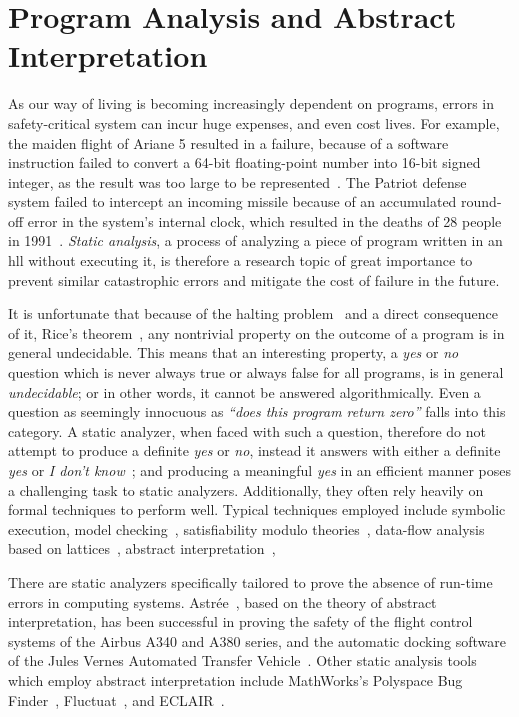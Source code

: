 \section{Program Analysis and Abstract Interpretation}
\label{bg:sec:abstract_interpretation}

As our way of living is becoming increasingly dependent on programs,
errors in safety-critical system can incur huge expenses, and even cost
lives.  For example, the maiden flight of Ariane 5 resulted in a failure,
because of a software instruction failed to convert a 64-bit floating-point
number into 16-bit signed integer, as the result was too large to be
represented~\cite{dowson97}.  The Patriot defense system failed to intercept
an incoming missile because of an accumulated round-off error in the
system's internal clock, which resulted in the deaths of 28 people in
1991~\cite{patriot}. \emph{Static analysis}, a process of analyzing a piece of
program written in an \gls{hll} without executing it, is therefore a research
topic of great importance to prevent similar catastrophic errors and mitigate
the cost of failure in the future.

It is unfortunate that because of the halting problem~\cite{turing37} and a
direct consequence of it, Rice's theorem~\cite{rice53}, any nontrivial property
on the outcome of a program is in general undecidable.  This means that an
interesting property, a \emph{yes} or \emph{no} question which is never always
true or always false for all programs, is in general \emph{undecidable};
or in other words, it cannot be answered algorithmically.  Even a question
as seemingly innocuous as \emph{``does this program return zero''} falls
into this category.  A static analyzer, when faced with such a question,
therefore do not attempt to produce a definite \emph{yes} or \emph{no},
instead it answers with either a definite \emph{yes} or \emph{I don't
know}~\cite{mine04}; and producing a meaningful \emph{yes} in an efficient
manner poses a challenging task to static analyzers.  Additionally, they
often rely heavily on formal techniques to perform well.  Typical techniques
employed include symbolic execution, model checking~\cite{kroening03},
satisfiability modulo theories~\cite{demoura08}, data-flow analysis based on
lattices~\cite{nielson99}, abstract interpretation~\cite{cousot77}, \etc{}

There are static analyzers specifically tailored to prove the absence of
run-time errors in computing systems.  Astr\'ee~\cite{astree}, based on
the theory of abstract interpretation, has been successful in proving the
safety of the flight control systems of the Airbus A340 and A380 series,
and the automatic docking software of the Jules Vernes Automated Transfer
Vehicle~\cite{dasia09}.  Other static analysis tools which employ abstract
interpretation include MathWorks's Polyspace Bug Finder~\cite{polyspace},
Fluctuat~\cite{Fluctuat}, and ECLAIR~\cite{eclair}.

